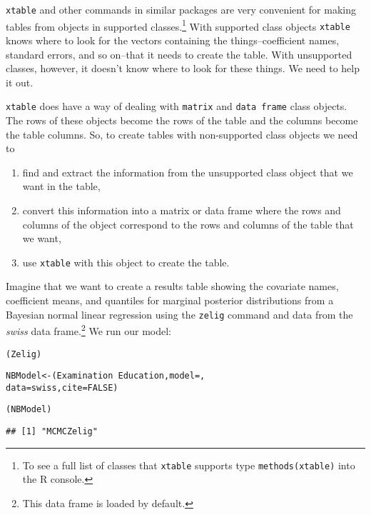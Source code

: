 {\tt{xtable}} and other commands in similar packages are very convenient for making tables from objects in supported classes.\footnote{To see a full list of classes that {\tt{xtable}} supports type {\tt{methods(xtable)}} into the R console.} With supported class objects {\tt{xtable}} knows where to look for the vectors containing the things--coefficient names, standard errors, and so on--that it needs to create the table. With unsupported classes, however, it doesn't know where to look for these things. We need to help it out. 

{\tt{xtable}} does have a way of dealing with {\tt{matrix}} and {\tt{data frame}} class objects. The rows of these objects become the rows of the table and the columns become the table columns. So, to create tables with non-supported class objects we need to

\begin{enumerate}
    \item find and extract the information from the unsupported class object that we want in the table, 
    \item convert this information into a matrix or data frame where the rows and columns of the object correspond to the rows and columns of the table that we want,
    \item use {\tt{xtable}} with this object to create the table.
\end{enumerate}

Imagine that we want to create a results table showing the covariate names, coefficient means, and quantiles for marginal posterior distributions from a Bayesian normal linear regression using the {\tt{zelig}} command \cite{Goodrich2007} and data from the {\emph{swiss}} data frame.\footnote{This data frame is loaded by default.} We run our model:

\begin{knitrout}
\color{fgcolor}\begin{kframe}
\begin{alltt}
(Zelig)

NBModel <- (Examination ~ Education, model = , 
                    data = swiss, cite = FALSE)

(NBModel)
\end{alltt}
\begin{verbatim}
## [1] "MCMCZelig"
\end{verbatim}
\end{kframe}
\end{knitrout}


